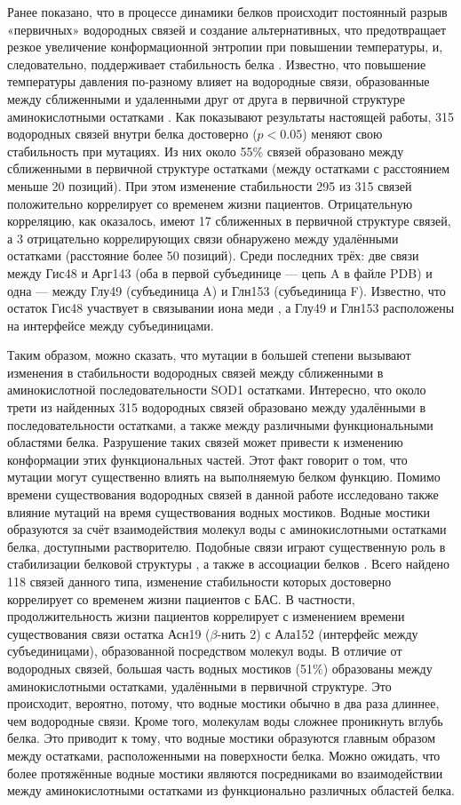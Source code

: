 Ранее показано, что в процессе динамики белков происходит постоянный разрыв «первичных» водородных связей и создание альтернативных, что предотвращает резкое увеличение конформационной энтропии при повышении температуры, и, следовательно, поддерживает стабильность белка \cite{Khechinashvili2006}.  Известно, что повышение температуры давления по-разному влияет на водородные связи, образованные между сближенными и удаленными друг от друга в первичной структуре аминокислотными остатками \cite{Nisius2012}. Как показывают результаты настоящей работы, 315 водородных связей внутри белка достоверно ($p < 0.05$) меняют свою стабильность при мутациях. Из них около 55\% связей образовано между сближенными в первичной структуре остатками (между остатками с расстоянием меньше 20 позиций). При этом изменение стабильности 295 из 315 связей положительно коррелирует со временем жизни пациентов. Отрицательную корреляцию, как оказалось, имеют 17 сближенных в первичной структуре связей, а 3 отрицательно коррелирующих связи обнаружено между удалёнными остатками (расстояние более 50 позиций). Среди последних трёх: две связи между Гис48 и Арг143 (оба в первой субъединице — цепь A в файле PDB) и одна — между Глу49 (субъединица A) и Глн153 (субъединица F).  Известно, что остаток Гис48 участвует в связывании иона меди \cite{Strange2006}, а Глу49 и Глн153 расположены на интерфейсе между субъединицами. 

Таким образом, можно сказать, что мутации в большей степени вызывают изменения в стабильности водородных связей между сближенными в аминокислотной последовательности SOD1 остатками. Интересно, что около трети из найденных 315  водородных связей образовано между удалёнными в последовательности остатками, а также между различными функциональными областями белка. Разрушение таких связей может привести к изменению конформации этих функциональных частей. Этот факт говорит о том, что мутации могут существенно влиять на выполняемую белком функцию. 
Помимо времени существования водородных связей в данной работе исследовано также влияние мутаций на время существования водных мостиков. Водные мостики образуются за счёт взаимодействия молекул воды с аминокислотными остатками белка, доступными растворителю. Подобные связи играют существенную роль в стабилизации белковой структуры \cite{Petukhov1999}, а также в ассоциации белков \cite{Papoian2003}. Всего найдено 118 связей данного типа, изменение стабильности которых достоверно коррелирует со временем жизни пациентов с БАС. В частности, продолжительность жизни пациентов коррелирует с изменением времени существования связи остатка Асн19 ($\beta$-нить 2) с Ала152 (интерфейс между субъединицами), образованной посредством молекул воды. 
В отличие от водородных связей, большая часть водных мостиков (51\%) образованы между аминокислотными остатками, удалёнными в первичной структуре. Это происходит, вероятно, потому, что водные мостики обычно в два раза длиннее, чем водородные связи. Кроме того, молекулам воды сложнее проникнуть вглубь белка. Это приводит к тому, что водные мостики образуются главным образом между остатками, расположенными на поверхности белка. Можно ожидать, что более протяжённые водные мостики являются посредниками во взаимодействии между аминокислотными остатками из функционально различных областей белка.

